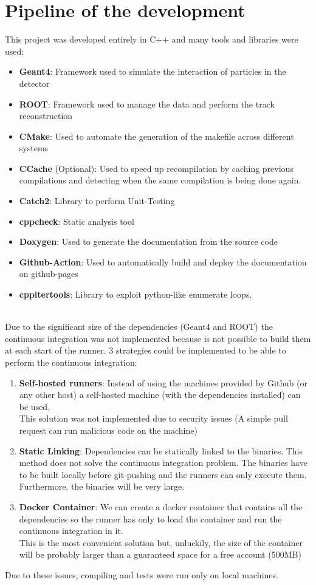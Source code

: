 \documentclass[10pt, a4paper, twocolumn]{article} %
\begin{document}
\section{Pipeline of the development}
This project was developed entirely in C++ and many tools and libraries were used:
\begin{itemize}
    \item \textbf{Geant4}: Framework used to simulate the interaction of particles in the detector
    \item \textbf{ROOT}: Framework used to manage the data and perform the track reconstruction 
    \item \textbf{CMake}: Used to automate the generation of the makefile across different systems
    \item \textbf{CCache} (Optional): Used to speed up recompilation by caching previous compilations and detecting when the same compilation is being done again.
    \item \textbf{Catch2}: Library to perform Unit-Testing
    \item \textbf{cppcheck}: Static analysis tool 
    \item \textbf{Doxygen}: Used to generate the documentation from the source code
    \item \textbf{Github-Action}: Used to automatically build and deploy the documentation on github-pages
    \item \textbf{cppitertools}: Library to exploit python-like enumerate loops.
    \end{itemize}
\\
Due to the significant size of the dependencies (Geant4 and ROOT) the continuous integration was not implemented because is not possible to build them at each start of the runner.
3 strategies could be implemented to be able to perform the continuous integration:
\begin{enumerate}
    \item \textbf{Self-hosted runners}: Instead of using the machines provided by Github (or any other host) a self-hosted machine (with the dependencies installed) can be used.\\
    This solution was not implemented due to security issues (A simple pull request can run  malicious code on the machine)
    \item \textbf{Static Linking}: Dependencies can be statically linked to the binaries. This method does not solve the continuous integration problem. The binaries have to be built locally before git-pushing and the runners can only execute them. \\
    Furthermore, the binaries will be very large.
    \item \textbf{Docker Container}: We can create a docker container that contains all the dependencies so the runner has only to load the container and run the continuous integration in it.\\
    This is the most convenient solution but, unluckily, the size of the container will be probably larger than a guaranteed space for a free account (500MB)
\end{enumerate}
Due to these issues, compiling and tests were run only on local machines.
\end{document}
